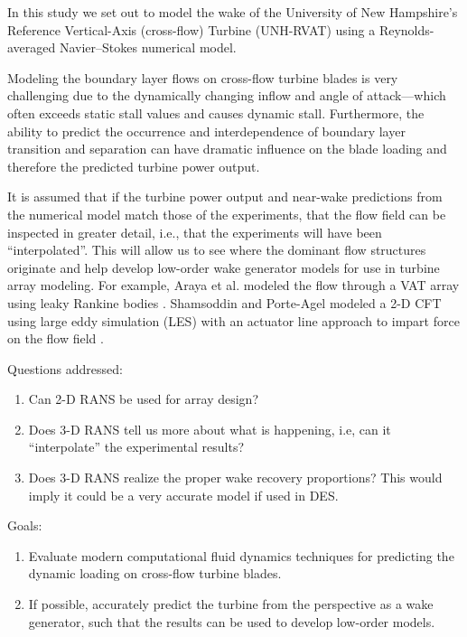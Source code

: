 \documentclass[aip,graphicx]{revtex4-1}
\begin{document}
In this study we set out to model the wake of the University of New Hampshire's
Reference Vertical-Axis (cross-flow) Turbine (UNH-RVAT) using a
Reynolds-averaged Navier--Stokes numerical model.

Modeling the boundary layer flows on cross-flow turbine blades is very
challenging due to the dynamically changing inflow and angle of attack---which
often exceeds static stall values and causes dynamic stall. Furthermore, the
ability to predict the occurrence and interdependence of boundary layer
transition and separation can have dramatic influence on the blade loading and
therefore the predicted turbine power output.

It is assumed that if the turbine power output and near-wake predictions from
the numerical model match those of the experiments, that the flow field can be
inspected in greater detail, i.e., that the experiments will have been
``interpolated''. This will allow us to see where the dominant flow structures
originate and help develop low-order wake generator models for use in turbine
array modeling. For example, Araya et al. modeled the flow through a VAT array
using leaky Rankine bodies \cite{Araya2014}. Shamsoddin and Porte-Agel modeled a 2-D CFT using large eddy simulation (LES) with an actuator line approach to impart force on the flow field \cite{Shamsoddin2014}.

Questions addressed:

\begin{enumerate}

    \item Can 2-D RANS be used for array design?

    \item Does 3-D RANS tell us more about what is happening, i.e, can it
    ``interpolate'' the experimental results?
    
    \item Does 3-D RANS realize the proper wake recovery proportions? This would
    imply it could be a very accurate model if used in DES.

\end{enumerate}

Goals:

\begin{enumerate}

    \item Evaluate modern computational fluid dynamics techniques for predicting
    the dynamic loading on cross-flow turbine blades.

    \item If possible, accurately predict the turbine from the perspective as a
    wake generator, such that the results can be used to develop low-order
    models.

\end{enumerate}
\end{document}
